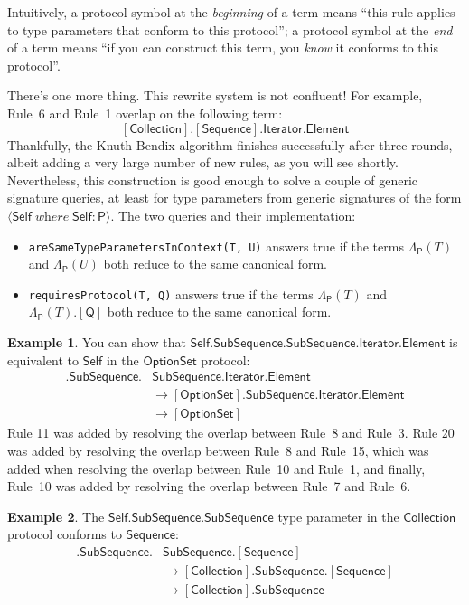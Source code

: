 \documentclass[headsepline,bibliography=totoc]{scrreport}
\newcommand{\namesym}[1]{\mathsf{#1}}
\newcommand{\genericparam}[1]{\bm{\mathsf{#1}}}
\newcommand{\proto}[1]{\bm{\mathsf{#1}}}
\newcommand{\protosym}[1]{[\proto{#1}]}
\newcommand{\gensig}[2]{\langle #1\;\textit{where}\;#2\rangle}
\theoremstyle{definition}
\newtheorem{example}{Example}[chapter]
\theoremstyle{definition}
\theoremstyle{definition}
\begin{document}
Intuitively, a protocol symbol at the \emph{beginning} of a term means ``this rule applies to type parameters that conform to this protocol''; a protocol symbol at the \emph{end} of a term means ``if you can construct this term, you \emph{know} it conforms to this protocol''.

There's one more thing. This rewrite system is not confluent! For example, Rule~6 and Rule~1 overlap on the following term:
\[\protosym{Collection}.\protosym{Sequence}.\namesym{Iterator}.\namesym{Element}\]
Thankfully, the Knuth-Bendix algorithm finishes successfully after three rounds, albeit adding a very large number of new rules, as you will see shortly. Nevertheless, this construction is good enough to solve a couple of generic signature queries, at least for type parameters from generic signatures of the form $\gensig{\genericparam{Self}}{\genericparam{Self}\colon\proto{P}}$. The two queries and their implementation:
\begin{itemize}
\item \texttt{areSameTypeParametersInContext(T, U)} answers true if the terms $\Lambda_{\proto{P}}(T)$ and $\Lambda_{\proto{P}}(U)$ both reduce to the same canonical form.
\item \texttt{requiresProtocol(T, Q)} answers true if the terms $\Lambda_{\proto{P}}(T)$ and $\Lambda_{\proto{P}}(T).\protosym{Q}$ both reduce to the same canonical form.
\end{itemize}
\begin{example}
You can show that $\genericparam{Self}.\namesym{SubSequence}.\namesym{SubSequence}.\namesym{Iterator}.\namesym{Element}$ is equivalent to $\genericparam{Self}$ in the $\proto{OptionSet}$ protocol:
\begin{align}
\protosym{OptionSet}.\namesym{SubSequence}.&\namesym{SubSequence}.\namesym{Iterator}.\namesym{Element}\nonumber\\
&\rightarrow\protosym{OptionSet}.\namesym{SubSequence}.\namesym{Iterator}.\namesym{Element}\tag{Rule 11}\\
&\rightarrow\protosym{OptionSet}\tag{Rule 20}
\end{align}
Rule 11 was added by resolving the overlap between Rule~8 and Rule~3. Rule 20 was added by resolving the overlap between Rule~8 and Rule~15, which was added when resolving the overlap between Rule~10 and Rule~1, and finally, Rule~10 was added by resolving the overlap between Rule~7 and Rule~6.
\end{example}
\begin{example}
The $\genericparam{Self}.\namesym{SubSequence}.\namesym{SubSequence}$ type parameter in the $\proto{Collection}$ protocol conforms to $\proto{Sequence}$:
\begin{align}
\protosym{Collection}.\namesym{SubSequence}.&\namesym{SubSequence}.\protosym{Sequence}\nonumber\\
&\rightarrow\protosym{Collection}.\namesym{SubSequence}.\protosym{Sequence}\tag{Rule 2}\\
&\rightarrow\protosym{Collection}.\namesym{SubSequence}\tag{Rule 10}
\end{align}
\end{example}
\end{document}

